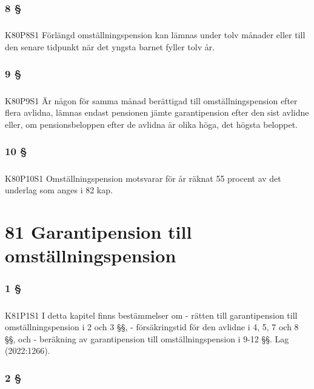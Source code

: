 \documentclass[a4paper,notitlepage,openany,10pt]{book}
\begin{document}
\subsection*{8 §}
\paragraph*{}
{\tiny K80P8S1}
Förlängd omställningspension kan lämnas under tolv månader eller till den senare tidpunkt när det yngsta barnet fyller tolv år.
\subsection*{9 §}
\paragraph*{}
{\tiny K80P9S1}
Är någon för samma månad berättigad till omställningspension efter flera avlidna, lämnas endast pensionen jämte garantipension efter den sist avlidne eller, om pensionsbeloppen efter de avlidna är olika höga, det högsta beloppet.
\subsection*{10 §}
\paragraph*{}
{\tiny K80P10S1}
Omställningspension motsvarar för år räknat 55 procent av det underlag som anges i 82 kap.
\chapter*{81 Garantipension till omställningspension}
\subsection*{1 §}
\paragraph*{}
{\tiny K81P1S1}
I detta kapitel finns bestämmelser om
\newline - rätten till garantipension till omställningspension i 2 och 3 §§,
\newline - försäkringstid för den avlidne i 4, 5, 7 och 8 §§, och
\newline - beräkning av garantipension till omställningspension i 9-12 §§.
Lag (2022:1266).
\subsection*{2 §}
\end{document}
